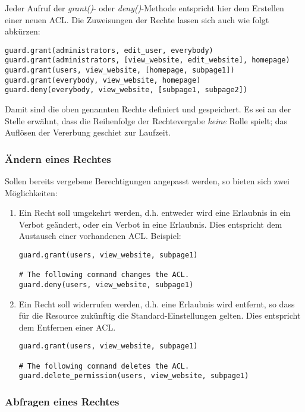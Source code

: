 Jeder Aufruf der {\it grant()}- oder {\it deny()}-Methode entspricht hier 
dem Erstellen einer neuen ACL.
Die Zuweisungen der Rechte lassen sich auch wie folgt abkürzen:

\begin{lstlisting}
guard.grant(administrators, edit_user, everybody)
guard.grant(administrators, [view_website, edit_website], homepage)
guard.grant(users, view_website, [homepage, subpage1])
guard.grant(everybody, view_website, homepage)
guard.deny(everybody, view_website, [subpage1, subpage2])
\end{lstlisting}

Damit sind die oben genannten Rechte definiert und gespeichert. Es sei an 
der Stelle erwähnt, dass die Reihenfolge der Rechtevergabe {\it keine} Rolle 
spielt; das Auflösen der Vererbung geschiet zur Laufzeit.


\subsubsection{Ändern eines Rechtes}

Sollen bereits vergebene Berechtigungen angepasst werden, so bieten sich zwei 
Möglichkeiten:

\begin{enumerate}
\item Ein Recht soll umgekehrt werden, d.h. entweder wird eine Erlaubnis 
in ein Verbot geändert, oder ein Verbot in eine Erlaubnis. Dies 
entspricht dem Austausch einer vorhandenen ACL. Beispiel:

\begin{lstlisting}
guard.grant(users, view_website, subpage1)

# The following command changes the ACL.
guard.deny(users, view_website, subpage1)
\end{lstlisting}

\item Ein Recht soll widerrufen werden, d.h. eine Erlaubnis wird entfernt, 
so dass für die Resource zukünftig die Standard-Einstellungen gelten. Dies 
entspricht dem Entfernen einer ACL.

\begin{lstlisting}
guard.grant(users, view_website, subpage1)

# The following command deletes the ACL.
guard.delete_permission(users, view_website, subpage1)
\end{lstlisting}
\end{enumerate}


\subsubsection{Abfragen eines Rechtes}

